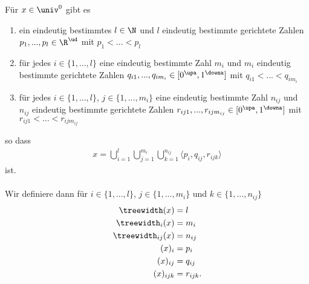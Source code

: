 \begin{satzdef}
    Für $x \in \univ^0$ gibt es
    \begin{enumerate}
        \item ein eindeutig bestimmtes $l \in \N$ und $l$ eindeutig bestimmte gerichtete Zahlen $p_1, ..., p_l \in \R^\ud$ mit $p_1 < ... < p_l$
        \item für jedes $i \in \{1, ..., l\}$ eine eindeutig bestimmte Zahl $m_i$ und $m_i$ eindeutig bestimmte gerichtete Zahlen $q_{i1}, ..., q_{im_i} \in [0^\upa, 1^\downa]$ mit $q_{i1} < ... < q_{im_i}$
        \item für jedes $i \in \{1, ..., l\}$, $j \in \{1, ..., m_i\}$ eine eindeutig bestimmte Zahl $n_{ij}$ und $n_{ij}$ eindeutig bestimmte gerichtete Zahlen $r_{ij1}, ..., r_{ijm_{ij}} \in [0^\upa, 1^\downa]$ mit $r_{ij1} < ... < r_{ijm_{ij}}$
    \end{enumerate}
    so dass
    \begin{align*}
        x = \bigcup_{i=1}^l \bigcup_{j=1}^{m_i} \bigcup_{k=1}^{n_{ij}} \langle p_i, q_{ij}, r_{ijk} \rangle
    \end{align*}
    ist.\\ \ \\
    Wir definiere dann für $i \in \{1, ..., l\}$, $j \in \{1, ..., m_i\}$ und $k \in \{1, ..., n_{ij}\}$
    \begin{align*}
        \treewidth(x) &= l\\
        \treewidth_i(x) &= m_i\\
        \treewidth_{ij}(x) &= n_{ij}\\
        (x)_i &= p_i\\
        (x)_{ij} &= q_{ij}\\
        (x)_{ijk} &= r_{ijk}.
    \end{align*}
\end{satzdef}



